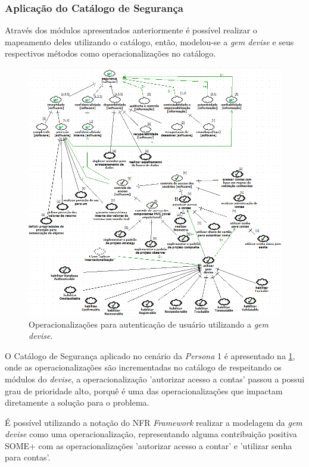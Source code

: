 \subsubsection{Aplicação do Catálogo de Segurança}

Através dos módulos apresentados anteriormente é possível realizar o mapeamento deles utilizando o catálogo, então, modelou-se a \textit{gem devise} e seus respectivos métodos como operacionalizações no catálogo. 


\begin{figure}[h!]
	\centering
	\includegraphics[keepaspectratio=true,scale=0.7]{figuras/catalogoPersona1.PNG}
	\caption{Operacionalizações para autenticação de usuário utilizando a \textit{gem devise}.}
	\label{catalogoPersona1}
\end{figure}


O Catálogo de Segurança aplicado no cenário da \textit{Persona} 1 é apresentado na \ref{catalogoPersona1}, onde as operacionalizações são incrementadas no catálogo de respeitando os módulos do \textit{devise}, a operacionalização 'autorizar acesso a contas' passou a possui grau de prioridade alto, porquê é uma das operacionalizações que impactam diretamente a solução para o problema. 

É possível utilizando a notação do NFR \textit{Framework} realizar a modelagem da \textit{gem devise} como uma operacionalização, representando alguma contribuição positiva SOME+ com as operacionalizações 'autorizar acesso a contar' e 'utilizar senha para contas'.
 

